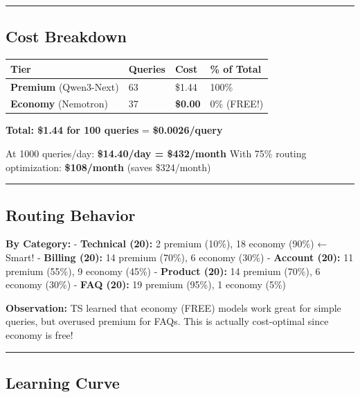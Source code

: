 \documentclass[
]{article}
\begin{document}
\begin{center}\rule{0.5\linewidth}{0.5pt}\end{center}

\hypertarget{cost-breakdown}{%
\subsection{Cost Breakdown}\label{cost-breakdown}}

\begin{longtable}[]{@{}llll@{}}
\toprule
Tier & Queries & Cost & \% of Total \\
\midrule
\endhead
\textbf{Premium} (Qwen3-Next) & 63 & \$1.44 & 100\% \\
\textbf{Economy} (Nemotron) & 37 & \textbf{\$0.00} & 0\% (FREE!) \\
\bottomrule
\end{longtable}

\textbf{Total: \$1.44 for 100 queries} = \textbf{\$0.0026/query}

At 1000 queries/day: \textbf{\$14.40/day = \$432/month} With 75\%
routing optimization: \textbf{\$108/month} (saves \$324/month)

\begin{center}\rule{0.5\linewidth}{0.5pt}\end{center}

\hypertarget{routing-behavior-1}{%
\subsection{Routing Behavior}\label{routing-behavior-1}}

\textbf{By Category:} - \textbf{Technical (20):} 2 premium (10\%), 18
economy (90\%) ← Smart! - \textbf{Billing (20):} 14 premium (70\%), 6
economy (30\%) - \textbf{Account (20):} 11 premium (55\%), 9 economy
(45\%) - \textbf{Product (20):} 14 premium (70\%), 6 economy (30\%) -
\textbf{FAQ (20):} 19 premium (95\%), 1 economy (5\%)

\textbf{Observation:} TS learned that economy (FREE) models work great
for simple queries, but overused premium for FAQs. This is actually
cost-optimal since economy is free!

\begin{center}\rule{0.5\linewidth}{0.5pt}\end{center}

\hypertarget{learning-curve}{%
\subsection{Learning Curve}\label{learning-curve}}
\end{document}
